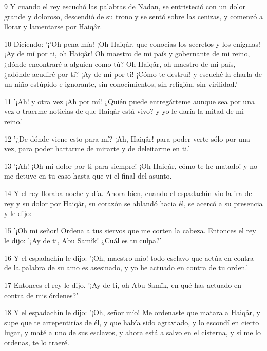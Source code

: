 \par 9 Y cuando el rey escuchó las palabras de Nadan, se entristeció con un dolor grande y doloroso, descendió de su trono y se sentó sobre las cenizas, y comenzó a llorar y lamentarse por Haiqâr.

\par 10 Diciendo: '¡'Oh pena mía! ¡Oh Haiqâr, que conocías los secretos y los enigmas! ¡Ay de mí por ti, oh Haiqâr! Oh maestro de mi país y gobernante de mi reino, ¿dónde encontraré a alguien como tú? Oh Haiqâr, oh maestro de mi país, ¿adónde acudiré por ti? ¡Ay de mí por ti! ¡Cómo te destruí! y escuché la charla de un niño estúpido e ignorante, sin conocimientos, sin religión, sin virilidad.'

\par 11 '¡Ah! y otra vez ¡Ah por mí! ¿Quién puede entregárteme aunque sea por una vez o traerme noticias de que Haiqâr está vivo? y yo le daría la mitad de mi reino.'

\par 12 '¿De dónde viene esto para mí? ¡Ah, Haiqâr! para poder verte sólo por una vez, para poder hartarme de mirarte y de deleitarme en ti.'

\par 13 '¡Ah! ¡Oh mi dolor por ti para siempre! ¡Oh Haiqâr, cómo te he matado! y no me detuve en tu caso hasta que vi el final del asunto.

\par 14 Y el rey lloraba noche y día. Ahora bien, cuando el espadachín vio la ira del rey y su dolor por Haiqâr, su corazón se ablandó hacia él, se acercó a su presencia y le dijo:

\par 15 '¡Oh mi señor! Ordena a tus siervos que me corten la cabeza. Entonces el rey le dijo: '¡Ay de ti, Abu Samîk! ¿Cuál es tu culpa?'

\par 16 Y el espadachín le dijo: '¡Oh, maestro mío! todo esclavo que actúa en contra de la palabra de su amo es asesinado, y yo he actuado en contra de tu orden.'

\par 17 Entonces el rey le dijo. '¡Ay de ti, oh Abu Samîk, en qué has actuado en contra de mis órdenes?'

\par 18 Y el espadachín le dijo: '¡Oh, señor mío! Me ordenaste que matara a Haiqâr, y supe que te arrepentirías de él, y que había sido agraviado, y lo escondí en cierto lugar, y maté a uno de sus esclavos, y ahora está a salvo en el cisterna, y si me lo ordenas, te lo traeré.

